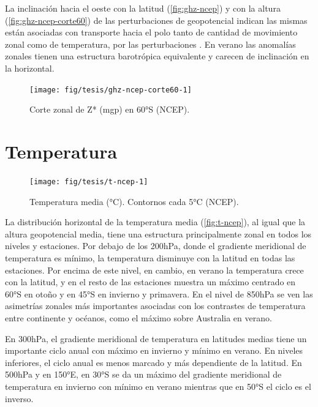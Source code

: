 \documentclass[spanish,a4paper,12pt,oneside]{book}
\begin{document}
La inclinación hacia el oeste con la latitud (\autoref{fig:ghz-ncep}) y
con la altura (\autoref{fig:ghz-ncep-corte60}) de las perturbaciones de
geopotencial indican las mismas están asociadas con transporte hacia el
polo tanto de cantidad de movimiento zonal como de temperatura, por las
perturbaciones \autocite{James}. En verano las anomalías zonales tienen
una estructura barotrópica equivalente y carecen de inclinación en la
horizontal.

\begin{figure}
\texttt{[image: fig/tesis/ghz-ncep-corte60-1]} \caption{Corte zonal de Z* (mgp) en 60°S (NCEP).}\label{fig:ghz-ncep-corte60}
\end{figure}

\section{Temperatura}\label{temperatura}

\begin{landscape}\begin{figure}

{\centering \texttt{[image: fig/tesis/t-ncep-1]} 

}

\caption{Temperatura media (°C). Contornos cada 5°C (NCEP).}\label{fig:t-ncep}
\end{figure}
\end{landscape}

La distribución horizontal de la temperatura media
(\autoref{fig:t-ncep}), al igual que la altura geopotencial media, tiene
una estructura principalmente zonal en todos los niveles y estaciones.
Por debajo de los 200hPa, donde el gradiente meridional de temperatura
es mínimo, la temperatura disminuye con la latitud en todas las
estaciones. Por encima de este nivel, en cambio, en verano la
temperatura crece con la latitud, y en el resto de las estaciones
muestra un máximo centrado en 60°S en otoño y en 45°S en invierno y
primavera. En el nivel de 850hPa se ven las asimetrías zonales más
importantes asociadas con los contrastes de temperatura entre continente
y océanos, como el máximo sobre Australia en verano.

En 300hPa, el gradiente meridional de temperatura en latitudes medias
tiene un importante ciclo anual con máximo en invierno y mínimo en
verano. En niveles inferiores, el ciclo anual es menos marcado y más
dependiente de la latitud. En 500hPa y en 150°E, en 30°S se da un máximo
del gradiente meridional de temperatura en invierno con mínimo en verano
mientras que en 50°S el ciclo es el inverso.
\end{document}

